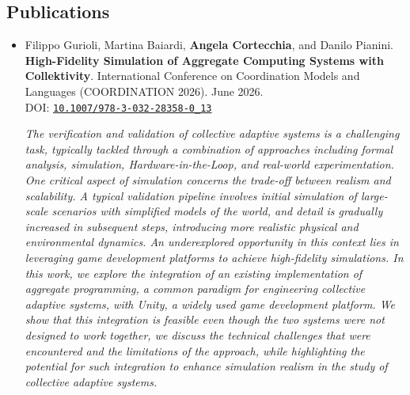 \documentclass[11pt]{scrartcl}
\newcommand{\pubentry}[6]{%
  \item
  #1.
  \textbf{#2}.
  #3.
  #4.
  \if\relax\detokenize{#6}\relax\else
    \\ DOI: \href{https://doi.org/#6}{\texttt{#6}}%
  \fi

  \begin{sloppypar}
    \vspace{8pt}
    \textit{#5}
    \vspace{8pt}
  \end{sloppypar}
}
\newenvironment{publications}
  {%
    \subsection*{Publications}
    \begin{itemize}
  }
  {%
    \end{itemize}
  }
\begin{document}
\begin{publications}
  \pubentry
  {Filippo Gurioli, Martina Baiardi, \textbf{Angela Cortecchia}, and Danilo Pianini}
  {High-Fidelity Simulation of Aggregate Computing Systems with Collektivity}
  {International Conference on Coordination Models and Languages (COORDINATION 2026)}
  {June 2026}
  {The verification and validation of collective adaptive systems is a challenging task, typically tackled through a combination of approaches including formal analysis, simulation, Hardware-in-the-Loop, and real-world experimentation. One critical aspect of simulation concerns the trade-off between realism and scalability. A typical validation pipeline involves initial simulation of large-scale scenarios with simplified models of the world, and detail is gradually increased in subsequent steps, introducing more realistic physical and environmental dynamics. An underexplored opportunity in this context lies in leveraging game development platforms to achieve high-fidelity simulations. In this work, we explore the integration of an existing implementation of aggregate programming, a common paradigm for engineering collective adaptive systems, with Unity, a widely used game development platform. We show that this integration is feasible even though the two systems were not designed to work together, we discuss the technical challenges that were encountered and the limitations of the approach, while highlighting the potential for such integration to enhance simulation realism in the study of collective adaptive systems.}
  {10.1007/978-3-032-28358-0\_13}


\end{publications}
\end{document}
